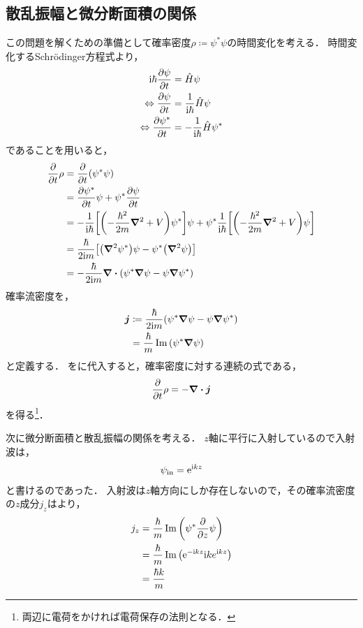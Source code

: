 \documentclass{report}
\begin{document}
  \subsection{散乱振幅と微分断面積の関係}
    この問題を解くための準備として確率密度$\rho \coloneqq \psi^{*} \psi$の時間変化を考える．
    時間変化するSchr\"odinger方程式より，
    \begin{align}
      \mathrm{i}\hbar\pdv{\psi}{t} &= \hat{H}\psi \\ 
      \Leftrightarrow \pdv{\psi}{t} &= \frac{1}{\mathrm{i}\hbar}\hat{H}\psi \\ 
      \Leftrightarrow \pdv{\psi^*}{t} &= -\frac{1}{\mathrm{i}\hbar}\hat{H}\psi^*
    \end{align}
    であることを用いると，
    \begin{align}
      \pdv{t}\rho &= \pdv{t}(\psi^{*}\psi) \\
      &= \pdv{\psi^*}{t}\psi + \psi^{*}\pdv{\psi}{t} \\
      &= -\frac{1}{\mathrm{i}\hbar}\qty[\qty(-\frac{\hbar^2}{2m}\grad^2 + V)\psi^{*}]\psi + \psi^{*}\frac{1}{\mathrm{i}\hbar}\qty[\qty(-\frac{\hbar^2}{2m}\grad^2 + V)\psi] \\
      &= \frac{\hbar}{2\mathrm{i} m}\qty[\qty(\grad^2 \psi^{*})\psi - \psi^{*}\qty(\grad^2\psi)] \\
      &= -\frac{\hbar}{2\mathrm{i} m}\div \qty(\psi^{*}\grad\psi - \psi \grad\psi^{*})\label{prob-density}
    \end{align}
    確率流密度を，
    \begin{align}
      \bm{j} &\coloneqq \frac{\hbar}{2\mathrm{i} m} \qty(\psi^{*}\grad\psi - \psi \grad\psi^{*})\label{prob-flow} \\
      &= \frac{\hbar}{m}\Im \qty(\psi^{*}\grad\psi)
    \end{align}
    と定義する．
    をに代入すると，確率密度に対する連続の式である，
    \begin{align}
      \pdv{t} \rho = -\div\bm{j}
    \end{align}
    を得る\footnote{両辺に電荷をかければ電荷保存の法則となる． }．
    \par
    次に微分断面積と散乱振幅の関係を考える．
    $z$軸に平行に入射しているので入射波は，
    \begin{align}
      \psi_{\mathrm{in}} = \mathrm{e}^{\mathrm{i} kz}
    \end{align}
    と書けるのであった．
    入射波は$z$軸方向にしか存在しないので，その確率流密度の$z$成分$j_z$はより，
    \begin{align}
      j_z &= \frac{\hbar}{m}\Im \qty(\psi^{*}\pdv{z}\psi) \\ 
      &= \frac{\hbar}{m} \Im \qty(\mathrm{e}^{-\mathrm{i} kz} \mathrm{i} k e^{\mathrm{i} kz}) \\
      &= \frac{\hbar k}{m}
    \end{align}%
\end{document}

